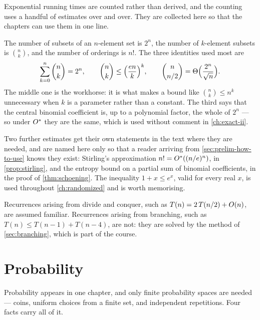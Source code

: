Exponential running times are counted rather than derived, and the counting
uses a handful of estimates over and over. They are collected here so that the
chapters can use them in one line.

The number of subsets of an $n$-element set is $2^n$, the number of
$k$-element subsets is $\binom{n}{k}$, and the number of orderings is $n!$.
The three identities used most are
\[ \sum_{k=0}^{n}\binom{n}{k} = 2^n, \qquad
   \binom{n}{k} \le \Bigl(\frac{en}{k}\Bigr)^{k}, \qquad
   \binom{n}{n/2} = \Theta\Bigl(\frac{2^n}{\sqrt n}\Bigr). \]
The middle one is the workhorse: it is what makes a bound like
$\binom{n}{k} \le n^k$ unnecessary when $k$ is a parameter rather than a
constant. The third says that the central binomial coefficient is, up to a
polynomial factor, the whole of $2^n$ --- so under $O^{*}$ they are the same,
which is used without comment in \cref{ch:exact-ii}.

Two further estimates get their own statements in the text where they are
needed, and are named here only so that a reader arriving from
\cref{sec:prelim-how-to-use} knows they exist: Stirling's approximation
$n! = O^{*}((n/e)^n)$, in \cref{prop:stirling}, and the entropy bound on a
partial sum of binomial coefficients, in the proof of \cref{thm:schoening}.
The inequality $1 + x \le e^{x}$, valid for every real $x$, is used throughout
\cref{ch:randomized} and is worth memorising.

Recurrences arising from divide and conquer, such as
$T(n) = 2\,T(n/2) + O\!\left(n\right)$, are assumed familiar. Recurrences arising from
branching, such as $T(n) \le T(n-1) + T(n-4)$, are not: they are solved by the
method of \cref{sec:branching}, which is part of the course.

\section{Probability}
\label{sec:prelim-probability}

Probability appears in one chapter, and only finite probability spaces are
needed --- coins, uniform choices from a finite set, and independent
repetitions. Four facts carry all of it.

